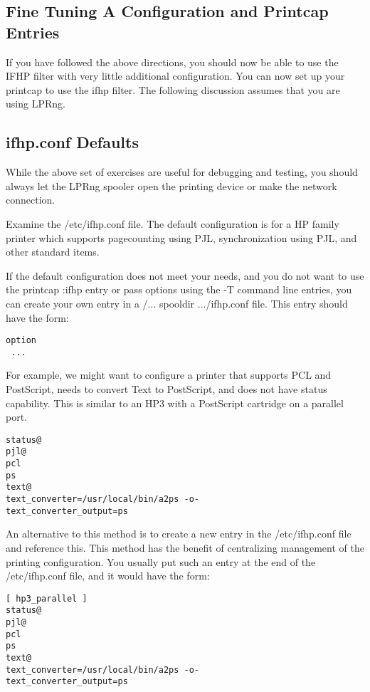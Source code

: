 \documentclass[a4paper]{article}
\begin{document}
\subsection{Fine Tuning A Configuration and Printcap Entries
\label{finetune}}

If you have followed the above directions,
you should now be able to use the IFHP filter with
very little additional configuration.
You can now set up your printcap to use the
{\ttfamily ifhp} filter.
The following discussion assumes that you are using LPRng.


\subsection{ifhp.conf Defaults}

While the above set of exercises are useful for debugging
and testing,
you should always let the LPRng spooler open the printing device
or make the network connection.

Examine the
{\ttfamily /etc/ifhp.conf}
file.
The default configuration is for a HP family printer
which supports pagecounting using PJL,
synchronization using PJL,
and other standard items.

If the default configuration does not meet your needs,
and you do not want to use the printcap
{\ttfamily :ifhp}
entry
or pass options using the
{\ttfamily -T}
command line entries,
you can create your own entry in a
{\ttfamily /... spooldir .../ifhp.conf}
file.
This entry should have the form:
\begin{tscreen}
\begin{verbatim}
option
 ...
\end{verbatim}
\end{tscreen}


For example,
we might want to configure a printer that supports PCL and PostScript,
needs to convert Text to PostScript,
and does not have status capability.
This is similar to an HP3 with a PostScript cartridge on a parallel port.
\begin{tscreen}
\begin{verbatim}
status@
pjl@
pcl
ps
text@
text_converter=/usr/local/bin/a2ps -o-
text_converter_output=ps
\end{verbatim}
\end{tscreen}


An alternative to this method is to create a new entry in the
{\ttfamily /etc/ifhp.conf}
file and reference this.
This method has the benefit of centralizing management of the
printing configuration.
You usually put such an entry at the end of the
{\ttfamily /etc/ifhp.conf}
file,
and it would have the form:
\begin{tscreen}
\begin{verbatim}
[ hp3_parallel ]
status@
pjl@
pcl
ps
text@
text_converter=/usr/local/bin/a2ps -o-
text_converter_output=ps
\end{verbatim}
\end{tscreen}
\end{document}
